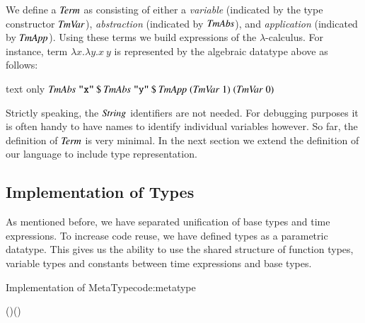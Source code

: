 We define a \ensuremath{\Conid{Term}} as consisting of either a \textit{variable} (indicated by the type constructor \ensuremath{\Conid{TmVar}}), \textit{abstraction} (indicated by \ensuremath{\Conid{TmAbs}}), and \textit{application} (indicated by \ensuremath{\Conid{TmApp}}).
Using these terms we build expressions of the $\lambda$-calculus.
For instance, term $\lambda x.\lambda y.x \: y$ is represented by the algebraic datatype above as follows:
\begin{changemargin}{1cm}{0cm}
\begin{expansionno}{text only}
\ensuremath{\Conid{TmAbs}\;\text{\tt \char34 x\char34}\mathbin{\$}\Conid{TmAbs}\;\text{\tt \char34 y\char34}\mathbin{\$}\Conid{TmApp}\;(\Conid{TmVar}\;\mathrm{1})\;(\Conid{TmVar}\;\mathrm{0})}
\end{expansionno}
\end{changemargin}

Strictly speaking, the \ensuremath{\Conid{String}} identifiers are not needed.
For debugging purposes it is often handy to have names to identify individual variables however.
So far, the definition of \ensuremath{\Conid{Term}} is very minimal.
In the next section we extend the definition of our language to include type representation. 

\subsection{Implementation of Types}
As mentioned before, we have separated unification of base types and time expressions.
To increase code reuse, we have defined types as a parametric datatype.
This gives us the ability to use the shared structure of function types, variable types and constants between time expressions and base types.

\begin{texexptitled}{Implementation of MetaType}{code:metatype}
\begin{hscode}\SaveRestoreHook
{}%
%
%
%
%
\>[B]{}\;\;\<[19]%
\>[19]{}\mathrel{=}{}\<[19E]%
\>[23]{}\;(\;)\;(\;){}\<[E]%
\\
\>[19]{}\mid {}\<[19E]%
\>[23]{}\;\<[E]%
\\
\>[19]{}\mid {}\<[19E]%
\>[23]{}\;\<[E]%
\\[\blanklineskip]%
\>[B]{}\;\mathrel{=}\<[E]%
\ColumnHook
\end{hscode}\resethooks
\end{texexptitled}


